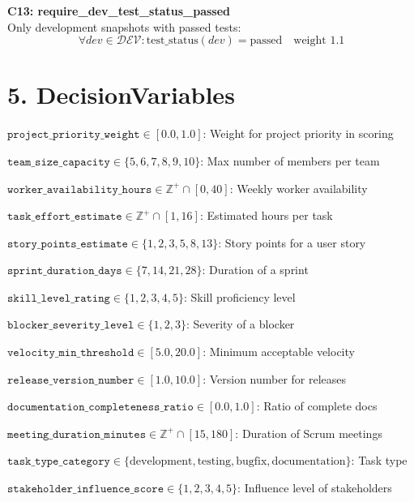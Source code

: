 \documentclass[12pt]{article}
\begin{document}
    \item \textbf{C13: require\_dev\_test\_status\_passed} \\
    Only development snapshots with passed tests:
    \[
    \forall dev \in \mathcal{DEV}: \text{test\_status}(dev) = \text{passed} \quad \text{weight } 1.1
    \]

\section{5. DecisionVariables}
\item $ \texttt{project\_priority\_weight} \in [0.0, 1.0] $: Weight for project priority in scoring
    \item $ \texttt{team\_size\_capacity} \in \{5,6,7,8,9,10\} $: Max number of members per team
    \item $ \texttt{worker\_availability\_hours} \in \mathbb{Z}^+ \cap [0, 40] $: Weekly worker availability
    \item $ \texttt{task\_effort\_estimate} \in \mathbb{Z}^+ \cap [1, 16] $: Estimated hours per task
    \item $ \texttt{story\_points\_estimate} \in \{1,2,3,5,8,13\} $: Story points for a user story
    \item $ \texttt{sprint\_duration\_days} \in \{7,14,21,28\} $: Duration of a sprint
    \item $ \texttt{skill\_level\_rating} \in \{1,2,3,4,5\} $: Skill proficiency level
    \item $ \texttt{blocker\_severity\_level} \in \{1,2,3\} $: Severity of a blocker
    \item $ \texttt{velocity\_min\_threshold} \in [5.0, 20.0] $: Minimum acceptable velocity
    \item $ \texttt{release\_version\_number} \in [1.0, 10.0] $: Version number for releases
    \item $ \texttt{documentation\_completeness\_ratio} \in [0.0, 1.0] $: Ratio of complete docs
    \item $ \texttt{meeting\_duration\_minutes} \in \mathbb{Z}^+ \cap [15, 180] $: Duration of Scrum meetings
    \item $ \texttt{task\_type\_category} \in \{\text{development}, \text{testing}, \text{bugfix}, \text{documentation}\} $: Task type
    \item $ \texttt{stakeholder\_influence\_score} \in \{1,2,3,4,5\} $: Influence level of stakeholders
\end{document}
